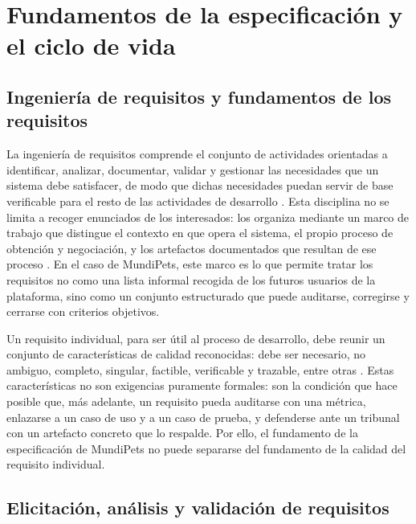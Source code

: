 \documentclass[journal,onecolumn]{IEEEtran}
\begin{document}

\section{Fundamentos de la especificación y el ciclo de vida}

\subsection{Ingeniería de requisitos y fundamentos de los requisitos}

La ingeniería de requisitos comprende el conjunto de actividades orientadas a identificar, analizar,
documentar, validar y gestionar las necesidades que un sistema debe satisfacer, de modo que dichas
necesidades puedan servir de base verificable para el resto de las actividades de desarrollo
\cite{ieee29148,pohl2025}. Esta disciplina no se limita a recoger enunciados de los interesados: los
organiza mediante un marco de trabajo que distingue el contexto en que opera el sistema, el propio
proceso de obtención y negociación, y los artefactos documentados que resultan de ese proceso
\cite{pohl2025}. En el caso de MundiPets, este marco es lo que permite tratar los requisitos no como
una lista informal recogida de los futuros usuarios de la plataforma, sino como un conjunto
estructurado que puede auditarse, corregirse y cerrarse con criterios objetivos.

Un requisito individual, para ser útil al proceso de desarrollo, debe reunir un conjunto de
características de calidad reconocidas: debe ser necesario, no ambiguo, completo, singular, factible,
verificable y trazable, entre otras \cite{ieee29148}. Estas características no son exigencias
puramente formales: son la condición que hace posible que, más adelante, un requisito pueda auditarse
con una métrica, enlazarse a un caso de uso y a un caso de prueba, y defenderse ante un tribunal con
un artefacto concreto que lo respalde. Por ello, el fundamento de la especificación de MundiPets no
puede separarse del fundamento de la calidad del requisito individual.

\subsection{Elicitación, análisis y validación de requisitos}
\end{document}
